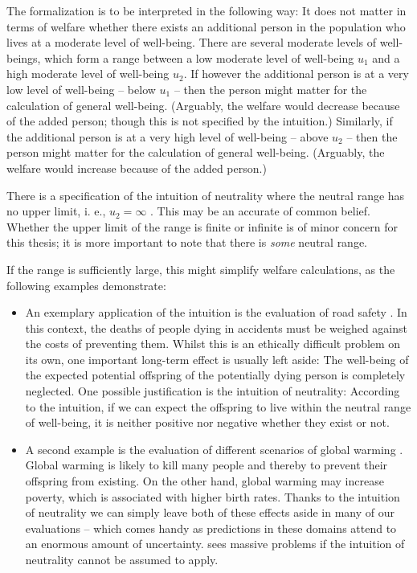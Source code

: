 The formalization is to be interpreted in the following way: It does not matter in terms of welfare whether there exists an additional person in the population who lives at a moderate level of well-being. There are several moderate levels of well-beings, which form a range between a low moderate level of well-being $u_1$ and a high moderate level of well-being $u_2$. If however the additional person is at a very low level of well-being – below $u_1$ – then the person might matter for the calculation of general well-being. (Arguably, the welfare would decrease because of the added person; though this is not specified by the intuition.) Similarly, if the additional person is at a very high level of well-being – above $u_2$ – then the person might matter for the calculation of general well-being. (Arguably, the welfare would increase because of the added person.) 

There is a specification of the intuition of neutrality where the neutral range has no upper limit, i. e., $u_2=\infty$ \cite[p.~113]{broome_2012}. This may be an accurate of common belief. Whether the upper limit of the range is finite or infinite is of minor concern for this thesis; it is more important to note that there is \emph{some} neutral range. 

If the range is sufficiently large, this might simplify welfare calculations, as the following examples demonstrate:

\begin{itemize}
\item An exemplary application of the intuition is the evaluation of road safety \cite[p.~144f]{broome_2004}. In this context, the deaths of people dying in accidents must be weighed against the costs of preventing them. Whilst this is an ethically difficult problem on its own, one important long-term effect is usually left aside: The well-being of the expected potential offspring of the potentially dying person is completely neglected. One possible justification is the intuition of neutrality: According to the intuition, if we can expect the offspring to live within the neutral range of well-being, it is neither positive nor negative whether they exist or not.
\item A second example is the evaluation of different scenarios of global warming \cite[p.~170]{broome_2012}. Global warming is likely to kill many people and thereby to prevent their offspring from existing. On the other hand, global warming may increase poverty, which is associated with higher birth rates. Thanks to the intuition of neutrality we can simply leave both of these effects aside in many of our evaluations – which comes handy as predictions in these domains attend to an enormous amount of uncertainty.  sees massive problems if the intuition of neutrality cannot be assumed to apply.
\end{itemize}

